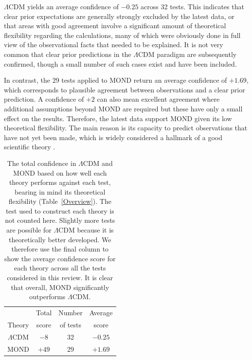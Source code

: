 \documentclass[fleqn,usenatbib,useAMS]{mnras} %
\begin{document}
$\Lambda$CDM yields an average confidence of $-0.25$ across 32 tests. This indicates that clear prior expectations are generally strongly excluded by the latest data, or that areas with good agreement involve a significant amount of theoretical flexibility regarding the calculations, many of which were obviously done in full view of the observational facts that needed to be explained. It is not very common that clear prior predictions in the $\Lambda$CDM paradigm are subsequently confirmed, though a small number of such cases exist and have been included.

In contrast, the 29 tests applied to MOND return an average confidence of $+1.69$, which corresponds to plausible agreement between observations and a clear prior prediction. A confidence of $+2$ can also mean excellent agreement where additional assumptions beyond MOND are required but these have only a small effect on the results. Therefore, the latest data support MOND given its low theoretical flexibility. The main reason is its capacity to predict observations that have not yet been made, which is widely considered a hallmark of a good scientific theory \citep{Merritt_2020}.

\begin{table}
	\centering
	\caption{The total confidence in $\Lambda$CDM and MOND based on how well each theory performs against each test, bearing in mind its theoretical flexibility (Table~\ref{Overview}). The test used to construct each theory is not counted here. Slightly more tests are possible for $\Lambda$CDM because it is theoretically better developed. We therefore use the final column to show the average confidence score for each theory across all the tests considered in this review. It is clear that overall, MOND significantly outperforms $\Lambda$CDM.}
	\begin{tabular}{cccc}
		\hline
		 & Total & Number & Average \\
		Theory & score & of tests & score \\ \hline
		$\Lambda$CDM & $-8$ & 32 & $-0.25$ \\
		MOND & $+49$ & 29 & $+1.69$ \\ \hline
	\end{tabular}
	\label{Final_scores}
\end{table}
\end{document}
